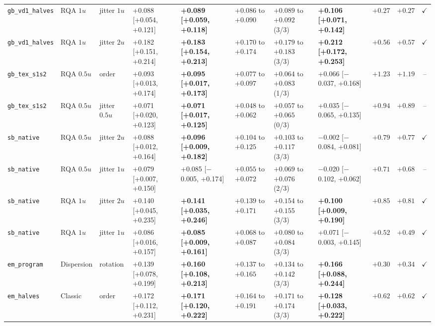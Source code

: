 \begin{longtable}{lllllllllrc}
\texttt{gb\_vd1\_halves} & RQA $1u$ & jitter $1u$ & +0.088 [+0.054, +0.121] & \textbf{+0.089 [+0.059, +0.118]} & $+0.086$ to $+0.090$ & $+0.089$ to $+0.092$ (3/3) & \textbf{+0.106 [+0.071, +0.142]} & $+0.27$ & $+0.27$ & $\checkmark$ \\
\texttt{gb\_vd1\_halves} & RQA $1u$ & jitter $2u$ & +0.182 [+0.151, +0.214] & \textbf{+0.183 [+0.154, +0.213]} & $+0.170$ to $+0.174$ & $+0.179$ to $+0.183$ (3/3) & \textbf{+0.212 [+0.172, +0.253]} & $+0.56$ & $+0.57$ & $\checkmark$ \\
\texttt{gb\_tex\_s1s2} & RQA $0.5u$ & order & +0.093 [+0.013, +0.174] & \textbf{+0.095 [+0.017, +0.173]} & $+0.077$ to $+0.097$ & $+0.064$ to $+0.083$ (1/3) & +0.066 [$-$0.037, +0.168] & $+1.23$ & $+1.19$ & -- \\
\texttt{gb\_tex\_s1s2} & RQA $0.5u$ & jitter $0.5u$ & +0.071 [+0.020, +0.123] & \textbf{+0.071 [+0.017, +0.125]} & $+0.048$ to $+0.062$ & $+0.057$ to $+0.065$ (0/3) & +0.035 [$-$0.065, +0.135] & $+0.94$ & $+0.89$ & -- \\
\texttt{sb\_native} & RQA $0.5u$ & jitter $2u$ & +0.088 [+0.012, +0.164] & \textbf{+0.096 [+0.009, +0.182]} & $+0.104$ to $+0.125$ & $+0.103$ to $+0.117$ (3/3) & $-$0.002 [$-$0.084, +0.081] & $+0.79$ & $+0.77$ & $\checkmark$ \\
\texttt{sb\_native} & RQA $0.5u$ & jitter $1u$ & +0.079 [+0.007, +0.150] & +0.085 [$-$0.005, +0.174] & $+0.055$ to $+0.072$ & $+0.069$ to $+0.076$ (2/3) & $-$0.020 [$-$0.102, +0.062] & $+0.71$ & $+0.68$ & -- \\
\texttt{sb\_native} & RQA $1u$ & jitter $2u$ & +0.140 [+0.045, +0.235] & \textbf{+0.141 [+0.035, +0.246]} & $+0.139$ to $+0.171$ & $+0.154$ to $+0.155$ (3/3) & \textbf{+0.100 [+0.009, +0.190]} & $+0.85$ & $+0.81$ & $\checkmark$ \\
\texttt{sb\_native} & RQA $1u$ & jitter $1u$ & +0.086 [+0.016, +0.157] & \textbf{+0.085 [+0.009, +0.161]} & $+0.068$ to $+0.087$ & $+0.080$ to $+0.084$ (3/3) & +0.071 [$-$0.003, +0.145] & $+0.52$ & $+0.49$ & $\checkmark$ \\
\texttt{em\_program} & Dispersion & rotation & +0.139 [+0.078, +0.199] & \textbf{+0.160 [+0.108, +0.213]} & $+0.137$ to $+0.165$ & $+0.134$ to $+0.142$ (3/3) & \textbf{+0.166 [+0.088, +0.244]} & $+0.30$ & $+0.34$ & $\checkmark$ \\
\texttt{em\_halves} & Classic & order & +0.172 [+0.112, +0.231] & \textbf{+0.171 [+0.120, +0.222]} & $+0.164$ to $+0.191$ & $+0.171$ to $+0.174$ (3/3) & \textbf{+0.128 [+0.033, +0.222]} & $+0.62$ & $+0.62$ & $\checkmark$ \\

\end{longtable}
